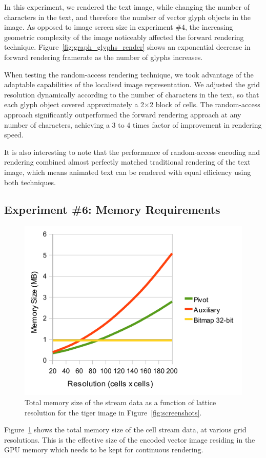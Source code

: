 \documentclass[11pt,a4paper,twoside]{article}
\begin{document}
In this experiment, we rendered the text image, while changing the number of characters in the text, and therefore the number of vector glyph objects in the image. As opposed to image screen size in experiment \#4, the increasing geometric complexity of the image noticeably affected the forward rendering technique. Figure~\ref{fig:graph_glyphs_render} shows an exponential decrease in forward rendering framerate as the number of glyphs increases.

When testing the random-access rendering technique, we took advantage of the adaptable capabilities of the localised image representation. We adjusted the grid resolution dynamically according to the number of characters in the text, so that each glyph object covered approximately a 2$\times$2 block of cells. The random-access approach significantly outperformed the forward rendering approach at any number of characters, achieving a 3 to 4 times factor of improvement in rendering speed.

It is also interesting to note that the performance of random-access encoding and rendering combined almost perfectly matched traditional rendering of the text image, which means animated text can be rendered with equal efficiency using both techniques.

\subsection {Experiment \#6: Memory Requirements}

\begin {figure} [h]
	\centering
	\includegraphics[width=0.55\columnwidth] {figures/graph_grid_memory}
	\caption {Total memory size of the stream data as a function of lattice resolution for the tiger image in Figure~\ref{fig:screenshots}.}
	\label {fig:graph_grid_memory}
\end {figure}

Figure~\ref{fig:graph_grid_memory} shows the total memory size of the cell stream data, at various grid resolutions. This is the effective size of the encoded vector image residing in the GPU memory which needs to be kept for continuous rendering.
\end{document}
